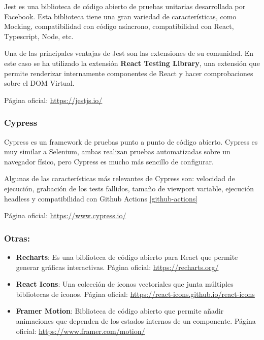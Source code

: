 Jest es una biblioteca de código abierto de pruebas unitarias
desarrollada por Facebook. Esta biblioteca tiene una gran variedad de
características, como Mocking, compatibilidad con código asíncrono,
compatibilidad con React, Typescript, Node, etc.

Una de las principales ventajas de Jest son las extensiones de su
comunidad. En este caso se ha utilizado la extensión \textbf{React
Testing Library}, una extensión que permite renderizar internamente
componentes de React y hacer comprobaciones sobre el DOM Virtual.

Página oficial: \href{https://jestjs.io/}{https://jestjs.io/}

\hypertarget{cypress}{%
\subsubsection{Cypress}\label{cypress}}

Cypress es un framework de pruebas punto a punto de código abierto.
Cypress es muy similar a Selenium, ambas realizan pruebas automatizadas
sobre un navegador físico, pero Cypress es mucho más sencillo de
configurar.

Algunas de las características más relevantes de Cypress son: velocidad de ejecución, grabación de los tests fallidos, tamaño de viewport variable, ejecución headless y compatibilidad con Github Actions \ref{github-actions}

Página oficial: \href{https://www.cypress.io/}{https://www.cypress.io/}

\hypertarget{otras}{%
\subsubsection{Otras:}\label{otras}}

\begin{itemize}
\item
  \textbf{Recharts}: Es una biblioteca de código abierto para React que
  permite generar gráficas interactivas.
  Página oficial: \href{https://recharts.org/}{https://recharts.org/}
\item
  \textbf{React Icons}: Una colección de iconos vectoriales que junta
  múltiples bibliotecas de iconos.
  Página oficial: \href{https://react-icons.github.io/react-icons}{https://react-icons.github.io/react-icons}
\item
  \textbf{Framer Motion}: Biblioteca de código abierto que permite
  añadir animaciones que dependen de los estados internos de un
  componente.
  Página oficial: \href{https://www.framer.com/motion/}{https://www.framer.com/motion/}
\end{itemize}

